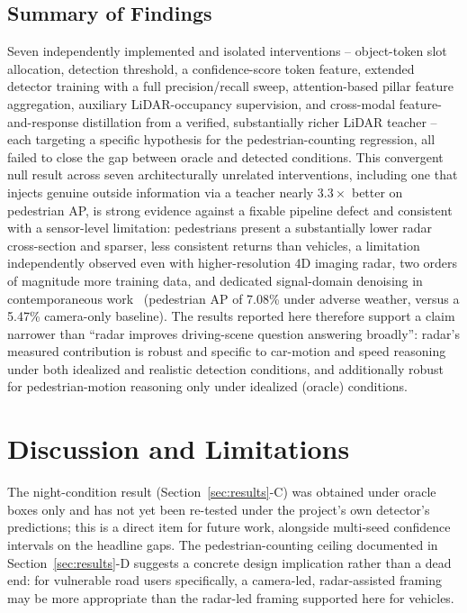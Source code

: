 \documentclass[conference]{IEEEtran}
\begin{document}
\subsection{Summary of Findings}
Seven independently implemented and isolated interventions -- object-token slot allocation, detection threshold,
a confidence-score token feature, extended detector training with a full precision/recall sweep, attention-based
pillar feature aggregation, auxiliary LiDAR-occupancy supervision, and cross-modal feature-and-response
distillation from a verified, substantially richer LiDAR teacher -- each targeting a specific hypothesis for the
pedestrian-counting regression, all failed to close the gap between oracle and detected conditions. This
convergent null result across seven architecturally unrelated interventions, including one that injects genuine
outside information via a teacher nearly $3.3\times$ better on pedestrian AP, is strong evidence against a
fixable pipeline defect and consistent with a sensor-level limitation: pedestrians present a substantially lower
radar cross-section and sparser, less consistent returns than vehicles, a limitation independently observed even
with higher-resolution 4D imaging radar, two orders of magnitude more training data, and dedicated signal-domain
denoising in contemporaneous work~\cite{liang2026rfusion4d} (pedestrian AP of 7.08\% under adverse weather, versus
a 5.47\% camera-only baseline). The results reported here therefore support a claim narrower than ``radar
improves driving-scene question answering broadly'': radar's measured contribution is robust and specific to
car-motion and speed reasoning under both idealized and realistic detection conditions, and additionally robust
for pedestrian-motion reasoning only under idealized (oracle) conditions.

\section{Discussion and Limitations}
The night-condition result (Section~\ref{sec:results}-C) was obtained under oracle boxes only and has not yet
been re-tested under the project's own detector's predictions; this is a direct item for future work, alongside
multi-seed confidence intervals on the headline gaps. The pedestrian-counting ceiling documented in
Section~\ref{sec:results}-D suggests a concrete design implication rather than a dead end: for vulnerable road
users specifically, a camera-led, radar-assisted framing may be more appropriate than the radar-led framing
supported here for vehicles.
\end{document}
